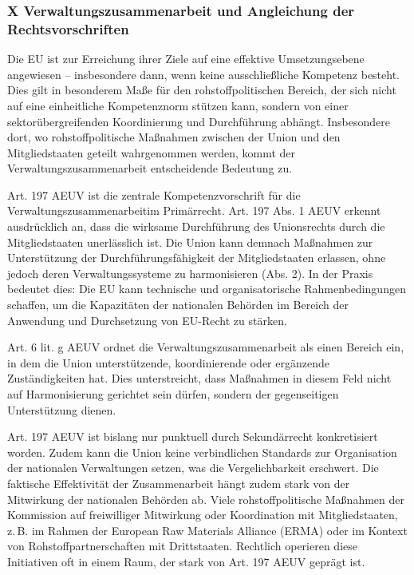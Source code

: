 \documentclass[12pt,a4paper,oneside]{book} %
\begin{document}
	
\subsubsection{X Verwaltungszusammenarbeit und Angleichung der Rechtsvorschriften}


Die EU ist zur Erreichung ihrer Ziele auf eine effektive Umsetzungsebene angewiesen -- insbesondere dann, wenn keine ausschließliche Kompetenz besteht. Dies gilt in besonderem Maße für den rohstoffpolitischen Bereich, der sich nicht auf eine einheitliche Kompetenznorm stützen kann, sondern von einer sektorübergreifenden Koordinierung und Durchführung abhängt.  Insbesondere dort, wo rohstoffpolitische Maßnahmen zwischen der Union und den Mitgliedstaaten geteilt wahrgenommen werden, kommt der Verwaltungszusammenarbeit entscheidende Bedeutung zu.

Art. 197 AEUV ist die zentrale Kompetenzvorschrift für die \glqq Verwaltungszusammenarbeit\grqq im Primärrecht. Art. 197 Abs. 1 AEUV erkennt ausdrücklich an, dass \glqq die wirksame Durchführung des Unionsrechts durch die Mitgliedstaaten unerlässlich ist\grqq. Die Union kann demnach Maßnahmen zur Unterstützung der Durchführungsfähigkeit der Mitgliedstaaten erlassen, ohne jedoch deren Verwaltungssysteme zu harmonisieren (Abs. 2). In der Praxis bedeutet dies: Die EU kann technische und organisatorische Rahmenbedingungen schaffen, um die Kapazitäten der nationalen Behörden im Bereich der Anwendung und Durchsetzung von EU-Recht zu stärken.

Art. 6 lit. g AEUV ordnet die Verwaltungszusammenarbeit als einen Bereich ein, in dem die Union unterstützende, koordinierende oder ergänzende Zuständigkeiten hat. Dies unterstreicht, dass Maßnahmen in diesem Feld nicht auf Harmonisierung gerichtet sein dürfen, sondern der gegenseitigen Unterstützung dienen.

Art. 197 AEUV ist bislang nur punktuell durch Sekundärrecht konkretisiert worden. Zudem kann die Union keine verbindlichen Standards zur Organisation der nationalen Verwaltungen setzen, was die Vergelichbarkeit erschwert. Die faktische Effektivität der Zusammenarbeit hängt zudem stark von der Mitwirkung der nationalen Behörden ab. Viele rohstoffpolitische Maßnahmen der Kommission auf freiwilliger Mitwirkung oder Koordination mit Mitgliedstaaten, z. B. im Rahmen der European Raw Materials Alliance (ERMA) oder im Kontext von Rohstoffpartnerschaften mit Drittstaaten. Rechtlich operieren diese Initiativen oft in einem Raum, der stark von Art. 197 AEUV geprägt ist.
\end{document}
